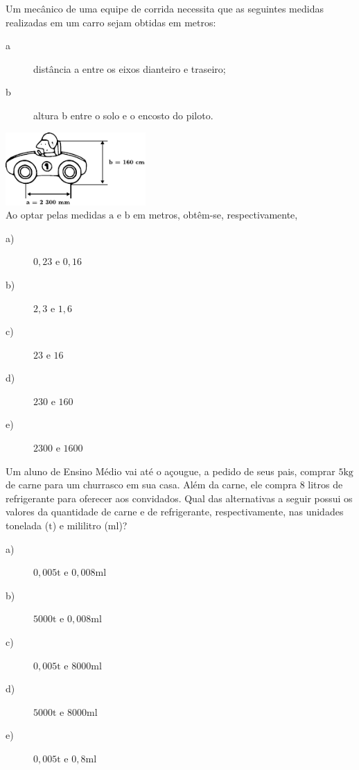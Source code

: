 \begin{exercise}[ENEM 2011]
Um mecânico de uma equipe de corrida necessita que as seguintes medidas realizadas em um carro sejam obtidas em metros:

\begin{description}
    \item[a] distância a entre os eixos dianteiro e traseiro;
    \item[b] altura b entre o solo e o encosto do piloto. 
\end{description}
\includegraphics[width=0.4\textwidth]{imagens/matematicaBasica/sistemaDeUnidades/carro.pdf}\\
Ao optar pelas medidas $\mathrm{a}$ e $\mathrm{b}$ em metros, obtêm-se, respectivamente,

    \begin{description}
        \item[a)] $0,23 \textrm{ e } 0,16$
        \item[b)] $2,3 \textrm{ e } 1,6$
        \item[c)] $23 \textrm{ e } 16$
        \item[d)] $230 \textrm{ e } 160$
        \item[e)] $2300 \textrm{ e } 1600$
    \end{description}

\end{exercise}

\begin{exercise}[ENEM 2011]
Um aluno de Ensino Médio vai até o açougue, a pedido de seus pais, comprar $5 \mathrm{kg}$ de carne para um churrasco em sua casa. Além da carne, ele compra $8$ litros de refrigerante para oferecer aos convidados. Qual das alternativas a seguir possui os valores da quantidade de carne e de refrigerante, respectivamente, nas unidades tonelada ($\mathrm{t}$) e mililitro ($\mathrm{ml}$)?

    \begin{description}
        \item[a)] $0,005 \mathrm{t} \textrm{ e } 0,008 \mathrm{ml}$
        \item[b)] $5000 \mathrm{t} \textrm{ e } 0,008 \mathrm{ml}$
        \item[c)] $0,005 \mathrm{t} \textrm{ e } 8000 \mathrm{ml}$
        \item[d)] $5000 \mathrm{t} \textrm{ e } 8000 \mathrm{ml}$
        \item[e)] $0,005 \mathrm{t} \textrm{ e } 0,8 \mathrm{ml}$
    \end{description}

\end{exercise}
